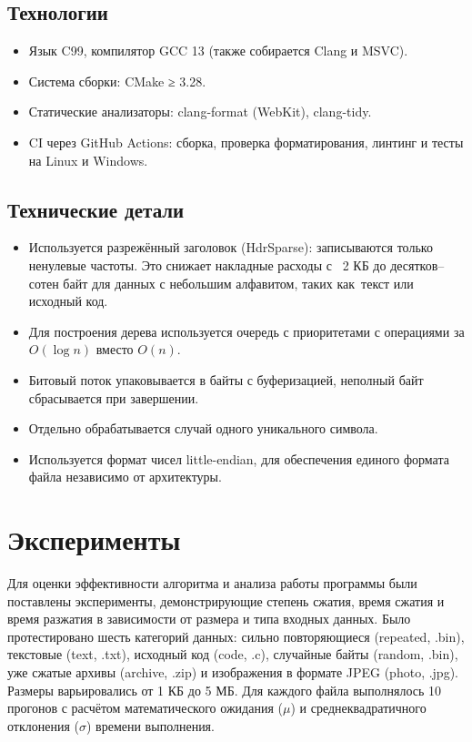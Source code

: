\documentclass[a4paper]{article}
\begin{document}
\subsection{Технологии}

\begin{itemize}
    \item Язык C99, компилятор GCC 13 (также собирается Clang и MSVC).
    \item Система сборки: CMake ≥ 3.28.
    \item Статические анализаторы: clang-format (WebKit), clang-tidy.
    \item CI через GitHub Actions: сборка, проверка форматирования, линтинг и тесты на Linux и Windows.
\end{itemize}

\subsection{Технические детали}

\begin{itemize}
    \item Используется разрежённый заголовок (HdrSparse): записываются только ненулевые частоты.
    Это снижает накладные расходы с ~2 КБ до десятков–сотен байт для данных с небольшим
    алфавитом, таких как~текст или исходный код.
    \item Для построения дерева используется очередь с приоритетами с операциями за $O(\log n)$ вместо $O(n)$.
    \item Битовый поток упаковывается в байты с буферизацией, неполный байт сбрасывается при завершении.
    \item Отдельно обрабатывается случай одного уникального символа.
    \item Используется формат чисел little-endian, для обеспечения единого формата файла независимо от архитектуры.
\end{itemize}

\section{Эксперименты}


Для оценки эффективности алгоритма и анализа работы программы были
поставлены эксперименты, демонстрирующие степень сжатия, время сжатия
и время разжатия в зависимости от размера и типа входных данных.
Было протестировано шесть категорий данных: сильно повторяющиеся
(repeated, .bin), текстовые (text, .txt), исходный код (code, .c),
случайные байты (random, .bin), уже сжатые архивы (archive, .zip)
и изображения в формате JPEG (photo, .jpg). Размеры варьировались
от 1 КБ до 5 МБ. Для каждого файла выполнялось 10 прогонов
с расчётом математического ожидания ($\mu$) и среднеквадратичного
отклонения ($\sigma$) времени выполнения.
\end{document}
